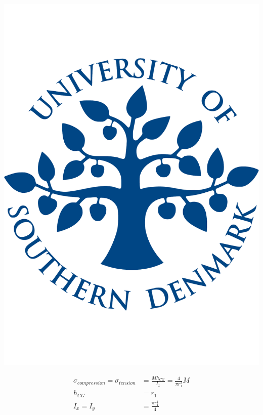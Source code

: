   \noindent\begin{minipage}{0.2\textwidth}%
      \includegraphics[width=\linewidth]{figures/sdu_logo.pdf}
  \end{minipage}%
  \hfill%
  \begin{minipage}{0.8\textwidth}
    \begin{equation}
    \begin{align*}
      \sigma _{compression} = \sigma _{tension} &= \frac{M h_{CG}}{I_x} = \frac{4}{\pi r_1 ^3} M\\
      h_{CG} &= r_1 \\
      I_x = I_y &= \frac{\pi r_1 ^4}{4}
      \end{align*}
    \end{equation}
  \end{minipage}

